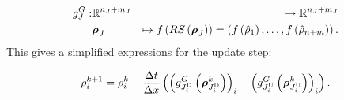 \begin{eqnarray}
\god_{\jn}: & \mathbb{R}^{\ninc_{\jn}+\nout_{\jn}} & \rightarrow\mathbb{R}^{\ninc_{\jn}+\nout_{\jn}}\nonumber \\
 & \juncstate{\jn}{} & \mapsto f\left(RS\left(\juncstate{\jn}{}\right)\right)=\left(f\left(\trace{\dvar}_{1}\right),\ldots,f\left(\trace{\dvar}_{\ninc+\nout}\right)\right)\label{eq:god-jn}.
\end{eqnarray}
This gives a simplified expressions for the update step:

\begin{equation}
\discrete{\link}{\tind+1}=\discrete{\link}{\tind}-\dfrac{\Delta t}{\Delta x}\left(\left(\god_{\jdown{\link}}\left(\juncstate{\jdown{\link}}{\tind}\right)\right)_{\link}-\left(\god_{\jup{\link}}\left(\juncstate{\jup{\link}}{\tind}\right)\right)_{\link}\right)\label{eq:composed-flux}.
\end{equation}







% 



